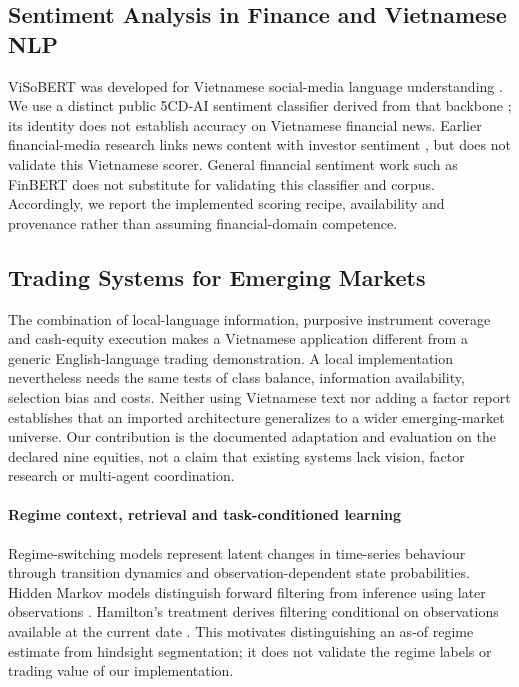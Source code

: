 \subsection{Sentiment Analysis in Finance and Vietnamese NLP}
ViSoBERT was developed for Vietnamese social-media language understanding \cite{nguyen2023visobert}. We use a distinct public 5CD-AI sentiment classifier derived from that backbone \cite{hf5cdsentiment}; its identity does not establish accuracy on Vietnamese financial news. Earlier financial-media research links news content with investor sentiment \cite{tetlock2007news}, but does not validate this Vietnamese scorer. General financial sentiment work such as FinBERT \cite{araci2019finbert} does not substitute for validating this classifier and corpus. Accordingly, we report the implemented scoring recipe, availability and provenance rather than assuming financial-domain competence. \subsection{Trading Systems for Emerging Markets}
The combination of local-language information, purposive instrument coverage and cash-equity execution makes a Vietnamese application different from a generic English-language trading demonstration. A local implementation nevertheless needs the same tests of class balance, information availability, selection bias and costs. Neither using Vietnamese text nor adding a factor report establishes that an imported architecture generalizes to a wider emerging-market universe. Our contribution is the documented adaptation and evaluation on the declared nine equities, not a claim that existing systems lack vision, factor research or multi-agent coordination.

\paragraph{Regime context, retrieval and task-conditioned learning}
Regime-switching models represent latent changes in time-series behaviour through transition dynamics and observation-dependent state probabilities. Hidden Markov models distinguish forward filtering from inference using later observations \cite{rabiner1989hmm}. Hamilton's treatment derives filtering conditional on observations available at the current date \cite{hamilton2005regimes}. This motivates distinguishing an as-of regime estimate from hindsight segmentation; it does not validate the regime labels or trading value of our implementation.

